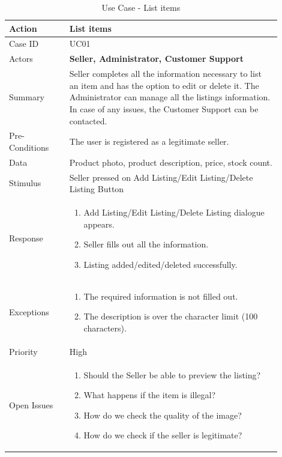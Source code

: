 \documentclass[11pt]{article}
\newcounter{use case ID}
\newcommand\tabularhead[1]{
    \begin{table}[ht]
        \addtocounter{use case ID}{1}
        \caption{Use Case \arabic{use case ID} - #1}
        \vspace{0.2cm}
        \begin{tabular}{|p{0.2\linewidth}|p{0.70\linewidth}|}
            \hline
            \textbf{Action} & \textbf{#1} \\
            \hline}
\newcommand\addrow[2]{#1 & #2\\ \hline}
\newcommand\addmulrow[2]{ \begin{minipage}[t][][t]{2.5cm}#1\end{minipage}
                &\begin{minipage}[t][][t]{11cm}
                    \begin{enumerate}[itemsep=-1ex] #2   \end{enumerate}
                \end{minipage}\vfill\\ \hline}
\newenvironment{usecase}{\tabularhead}
        {\hline\end{tabular}\end{table}}
\newcounter{req ID}
\begin{document}
\begin{usecase}{List items}
    \addrow{Case ID}{UC01}
    \addrow{Actors}{\textbf{Seller, Administrator, Customer Support}}
    \addrow{Summary}{Seller completes all the information necessary to list an item and has the option to edit or delete it. The Administrator can manage all the listings information. In case of any issues, the Customer Support can be contacted.}
    \addrow{Pre-Conditions}{The user is registered as a legitimate seller.}
    \addrow{Data}{Product photo, product description, price, stock count.}
    \addrow{Stimulus}{Seller pressed on Add Listing/Edit Listing/Delete Listing Button}
    \addmulrow{Response}{
            \item Add Listing/Edit Listing/Delete Listing dialogue appears.
            \item Seller fills out all the information.
            \item Listing added/edited/deleted successfully.
    }
    \addmulrow{Exceptions}{
            \item The required information is not filled out.
            \item The description is over the character limit (100 characters). 
    }
    \addrow{Priority}{High}
    \addmulrow{Open Issues}{
            \item Should the Seller be able to preview the listing?
            \item What happens if the item is illegal? 
            \item How do we check the quality of the image?
            \item How do we check if the seller is legitimate?
    }
\end{usecase}
\end{document}
